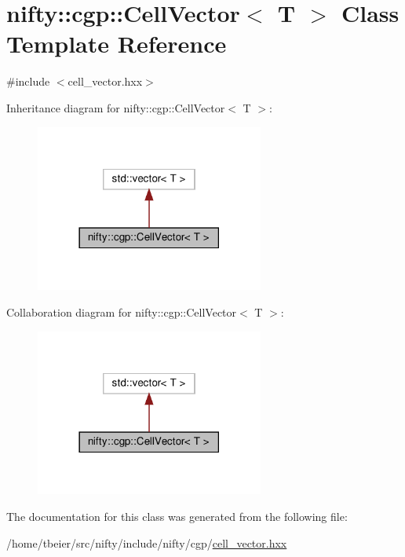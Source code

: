 \hypertarget{classnifty_1_1cgp_1_1CellVector}{}\section{nifty\+:\+:cgp\+:\+:Cell\+Vector$<$ T $>$ Class Template Reference}
\label{classnifty_1_1cgp_1_1CellVector}


{\ttfamily \#include $<$cell\+\_\+vector.\+hxx$>$}



Inheritance diagram for nifty\+:\+:cgp\+:\+:Cell\+Vector$<$ T $>$\+:
\nopagebreak
\begin{figure}[H]
\begin{center}
\leavevmode
\includegraphics[width=213pt]{classnifty_1_1cgp_1_1CellVector__inherit__graph}
\end{center}
\end{figure}


Collaboration diagram for nifty\+:\+:cgp\+:\+:Cell\+Vector$<$ T $>$\+:
\nopagebreak
\begin{figure}[H]
\begin{center}
\leavevmode
\includegraphics[width=213pt]{classnifty_1_1cgp_1_1CellVector__coll__graph}
\end{center}
\end{figure}


The documentation for this class was generated from the following file\+:\begin{DoxyCompactItemize}
\item 
/home/tbeier/src/nifty/include/nifty/cgp/\hyperlink{cell__vector_8hxx}{cell\+\_\+vector.\+hxx}\end{DoxyCompactItemize}
